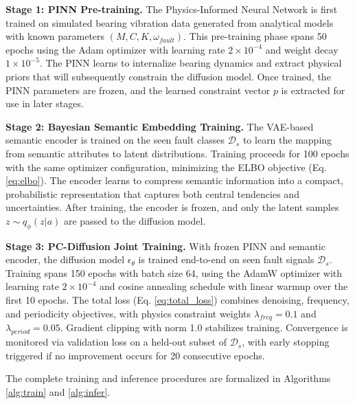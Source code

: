 \textbf{Stage 1: PINN Pre-training.} The Physics-Informed Neural Network is first trained on simulated bearing vibration data generated from analytical models with known parameters $(M, C, K, \omega_{fault})$. This pre-training phase spans 50 epochs using the Adam optimizer with learning rate $2 \times 10^{-4}$ and weight decay $1 \times 10^{-5}$. The PINN learns to internalize bearing dynamics and extract physical priors that will subsequently constrain the diffusion model. Once trained, the PINN parameters are frozen, and the learned constraint vector $p$ is extracted for use in later stages.

\textbf{Stage 2: Bayesian Semantic Embedding Training.} The VAE-based semantic encoder is trained on the seen fault classes $\mathcal{D}_s$ to learn the mapping from semantic attributes to latent distributions. Training proceeds for 100 epochs with the same optimizer configuration, minimizing the ELBO objective (Eq. \ref{eq:elbo}). The encoder learns to compress semantic information into a compact, probabilistic representation that captures both central tendencies and uncertainties. After training, the encoder is frozen, and only the latent samples $z \sim q_\phi(z|a)$ are passed to the diffusion model.

\textbf{Stage 3: PC-Diffusion Joint Training.} With frozen PINN and semantic encoder, the diffusion model $\epsilon_\theta$ is trained end-to-end on seen fault signals $\mathcal{D}_s$. Training spans 150 epochs with batch size 64, using the AdamW optimizer with learning rate $2 \times 10^{-4}$ and cosine annealing schedule with linear warmup over the first 10 epochs. The total loss (Eq. \ref{eq:total_loss}) combines denoising, frequency, and periodicity objectives, with physics constraint weights $\lambda_{freq}=0.1$ and $\lambda_{period}=0.05$. Gradient clipping with norm 1.0 stabilizes training. Convergence is monitored via validation loss on a held-out subset of $\mathcal{D}_s$, with early stopping triggered if no improvement occurs for 20 consecutive epochs.

The complete training and inference procedures are formalized in Algorithms \ref{alg:train} and \ref{alg:infer}.


